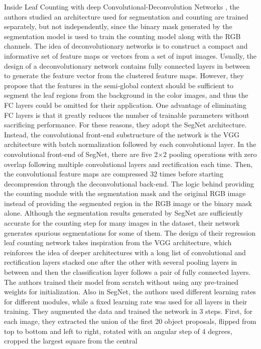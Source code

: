 Inside Leaf Counting with deep Convolutional-Deconvolution Networks \cite{Aich_2017_ICCV}, the authors studied an architecture used for segmentation and counting are trained separately, but not independently, since the binary mask generated by
the segmentation model is used to train the counting model along with the RGB channels. The idea of deconvolutionary networks is to construct a compact and informative
set of feature maps or vectors from a set of input images. Usually, the design of a deconvolutionary network contains fully connected layers in between to generate the
feature vector from the clustered feature maps. However, they propose that the features in the semi-global context should be sufficient to segment the leaf regions from 
the background in the color images, and thus the FC layers could be omitted for their application. One advantage of eliminating FC layers is that it greatly reduces the
number of trainable parameters without sacrificing performance. For these reasons, they adopt the SegNet architecture. Instead, the convolutional front-end substructure
of the network is the VGG architecture with batch normalization followed by each convolutional layer. In the convolutional front-end of SegNet, there are five 2×2 pooling
operations with zero overlap following multiple convolutional layers and rectification each time. Then, the convolutional feature maps are compressed 32 times before
starting decompression through the deconvolutional back-end. The logic behind providing the counting module with the segmentation mask and the original RGB image instead
of providing the segmented region in the RGB image or the binary mask alone. Although the segmentation results generated by SegNet are sufficiently accurate for the
counting step for many images in the dataset, their network generates spurious segmentations for some of them. The design of their regression leaf counting network takes
inspiration from the VGG architecture, which reinforces the idea of deeper architectures with a long list of convolutional and rectification layers stacked one after
the other with several pooling layers in between and then the classification layer follows a pair of fully connected layers. The authors trained their model from
scratch without using any pre-trained weights for initialization. Also in SegNet, the authors used different learning rates for different modules, while a fixed
learning rate was used for all layers in their training. They augmented the data and trained the network in 3 steps. First, for each image, they extracted the union
of the first 20 object proposals, flipped from top to bottom and left to right, rotated with an angular step of 4 degrees, cropped the largest square from the central
